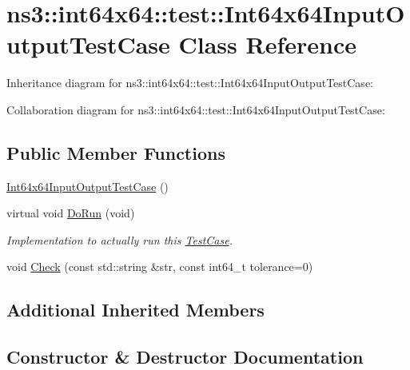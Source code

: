 \hypertarget{classns3_1_1int64x64_1_1test_1_1Int64x64InputOutputTestCase}{}\section{ns3\+:\+:int64x64\+:\+:test\+:\+:Int64x64\+Input\+Output\+Test\+Case Class Reference}
\label{classns3_1_1int64x64_1_1test_1_1Int64x64InputOutputTestCase}


Inheritance diagram for ns3\+:\+:int64x64\+:\+:test\+:\+:Int64x64\+Input\+Output\+Test\+Case\+:


Collaboration diagram for ns3\+:\+:int64x64\+:\+:test\+:\+:Int64x64\+Input\+Output\+Test\+Case\+:
\subsection*{Public Member Functions}
\begin{DoxyCompactItemize}
\item 
\hyperlink{classns3_1_1int64x64_1_1test_1_1Int64x64InputOutputTestCase_acea60afd360a1326b05aee583eed8b17}{Int64x64\+Input\+Output\+Test\+Case} ()
\item 
virtual void \hyperlink{classns3_1_1int64x64_1_1test_1_1Int64x64InputOutputTestCase_a8b8c0fdc37141bd0bd56b4de97baecb9}{Do\+Run} (void)
\begin{DoxyCompactList}\small\item\em Implementation to actually run this \hyperlink{classns3_1_1TestCase}{Test\+Case}. \end{DoxyCompactList}\item 
void \hyperlink{classns3_1_1int64x64_1_1test_1_1Int64x64InputOutputTestCase_a6f7e206318aaae2804084d97e2c1676a}{Check} (const std\+::string \&str, const int64\+\_\+t tolerance=0)
\end{DoxyCompactItemize}
\subsection*{Additional Inherited Members}


\subsection{Constructor \& Destructor Documentation}

